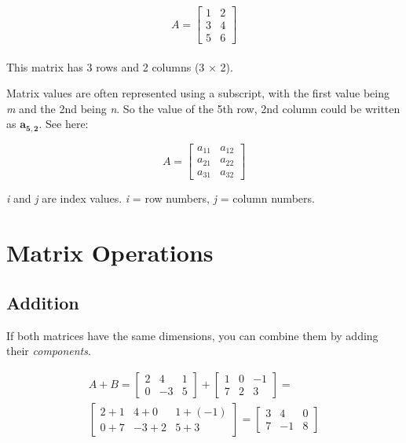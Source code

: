 \documentclass[12pt]{report}
\begin{document}
        \begin{equation}
            {A} = \begin{bmatrix} 
                1 & 2 \\ 
                3 & 4 \\ 
                5 & 6
            \end{bmatrix}
        \end{equation} \\

        This matrix has 3 rows and 2 columns (3 $\times$ 2).
        
        Matrix values are often represented using a subscript, with the first value being \emph{m} and the 2nd being \emph{n}. So the value of the 5th row, 2nd column could be written as $\mathbf{a_{5,2}}$. See here:
        
        \begin{equation}
            {A} = \begin{bmatrix} 
                a_{11} & a_{12} \\ 
                a_{21} & a_{22} \\ 
                a_{31} & a_{32}
            \end{bmatrix}
        \end{equation} 

        \emph{i} and \emph{j} are index values. \emph{i} = row numbers, \emph{j} = column numbers.

    \section{Matrix Operations}
        \subsection{Addition}
            If both matrices have the same dimensions, you can combine them by adding their \emph{components}.

            \begin{multline}
            A + B =
                \begin{bmatrix} 2 & 4 & 1 \\ 0 & -3 & 5 \end{bmatrix} +
                \begin{bmatrix} 1 & 0 & -1 \\ 7 & 2 & 3 \end{bmatrix} = \\
                \begin{bmatrix} 2 + 1 & 4 + 0 & 1 + (-1) \\ 0 + 7 & -3 + 2 & 5 + 3 \end{bmatrix} =
                \begin{bmatrix} 3 & 4 & 0 \\ 7 & -1 & 8 \end{bmatrix}
            \end{multline}
            
\end{document}
